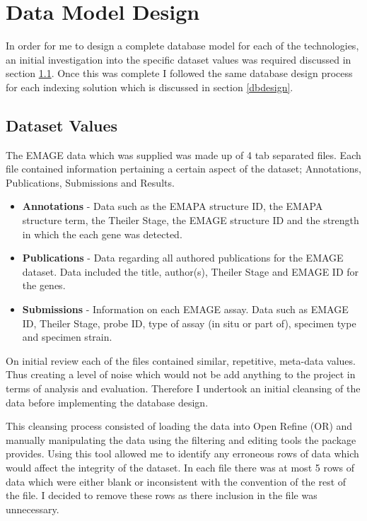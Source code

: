 \chapter{Data Model Design}\label{design}

In order for me to design a complete database model for each of the technologies, an initial investigation into the specific dataset values was required discussed in section \ref{datasetvalues}. Once this was complete I followed the same database design process for each indexing solution which is discussed in section \ref{dbdesign}.

\section{Dataset Values}\label{datasetvalues}

The EMAGE data which was supplied was made up of 4 tab separated files. Each file contained information pertaining a certain aspect of the dataset; Annotations, Publications, Submissions and Results.

\begin{itemize}
\item \textbf{Annotations} - Data such as the EMAPA structure ID, the EMAPA structure term, the Theiler Stage, the EMAGE structure ID and the strength in which the each gene was detected.

\item \textbf{Publications} - Data regarding all authored publications for the EMAGE dataset. Data included the title, author(s), Theiler Stage and EMAGE ID for the genes.

\item \textbf{Submissions} - Information on each EMAGE assay. Data such as EMAGE ID, Theiler Stage, probe ID, type of assay (in situ or part of), specimen type and specimen strain.

\end{itemize}
On initial review each of the files contained similar, repetitive, meta-data values. Thus creating a level of noise which would not be add anything to the project in terms of analysis and evaluation. Therefore I undertook an initial cleansing of the data before implementing the database design.

This cleansing process consisted of loading the data into Open Refine (OR) and manually manipulating the data using the filtering and editing tools the package provides. Using this tool allowed me to identify any erroneous rows of data which would affect the integrity of the dataset. In each file there was at most 5 rows of data which were either blank or inconsistent with the convention of the rest of the file. I decided to remove these rows as there inclusion in the file was unnecessary.

